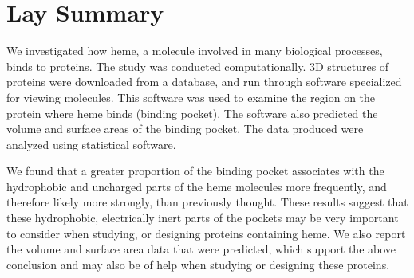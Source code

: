 \documentclass[a4paper, nobind]{templates/ociamthesis}
\begin{document}
\begin{romanpages}
\flushbottom

\tableofcontents

\listoffigures
	\mtcaddchapter

\listoftables
  \mtcaddchapter

\end{romanpages}

\flushbottom

\hypertarget{lay-summary}{%
\chapter*{Lay Summary}\label{lay-summary}}

\adjustmtc
{}

We investigated how heme, a molecule involved in many biological processes, binds to proteins. The study was conducted computationally. 3D structures of proteins were downloaded from a database, and run through software specialized for viewing molecules. This software was used to examine the region on the protein where heme binds (binding pocket). The software also predicted the volume and surface areas of the binding pocket. The data produced were analyzed using statistical software.

We found that a greater proportion of the binding pocket associates with the hydrophobic and uncharged parts of the heme molecules more frequently, and therefore likely more strongly, than previously thought. These results suggest that these hydrophobic, electrically inert parts of the pockets may be very important to consider when studying, or designing proteins containing heme. We also report the volume and surface area data that were predicted, which support the above conclusion and may also be of help when studying or designing these proteins.
\end{document}
